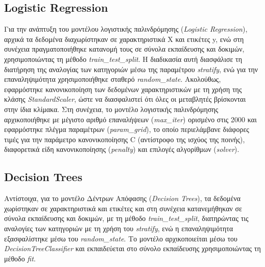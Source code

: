 \documentclass[diploma]{softlab-thesis}
\begin{document}
\begin{enumerate}
\begin{enumerate}
\subsection{Logistic Regression}

Για την ανάπτυξη του μοντέλου λογιστικής παλινδρόμησης (\textit{Logistic Regression}), αρχικά τα δεδομένα διαχωρίστηκαν σε χαρακτηριστικά X και ετικέτες y, ενώ στη συνέχεια πραγματοποιήθηκε κατανομή τους σε σύνολα εκπαίδευσης και δοκιμών, χρησιμοποιώντας τη μέθοδο \textit{train\_test\_split}. Η διαδικασία αυτή διασφάλισε τη διατήρηση της αναλογίας των κατηγοριών μέσω της παραμέτρου \textit{stratify}, ενώ για την επαναληψιμότητα χρησιμοποιήθηκε σταθερό \textit{random\_state}. Ακολούθως, εφαρμόστηκε κανονικοποίηση των δεδομένων χαρακτηριστικών με τη χρήση της κλάσης \textit{StandardScaler}, ώστε να διασφαλιστεί ότι όλες οι μεταβλητές βρίσκονται στην ίδια κλίμακα. Στη συνέχεια, το μοντέλο λογιστικής παλινδρόμησης αρχικοποιήθηκε με μέγιστο αριθμό επαναλήψεων (\textit{max\_iter}) ορισμένο στις 2000 και εφαρμόστηκε πλέγμα παραμέτρων (\textit{param\_grid}), το οποίο περιελάμβανε διάφορες τιμές για την παράμετρο κανονικοποίησης C (αντίστροφο της ισχύος της ποινής), διαφορετικά είδη κανονικοποίησης (\textit{penalty}) και επιλογές αλγορίθμων (\textit{solver}).


\subsection{Decision Trees}

Αντίστοιχα, για το μοντέλο Δέντρων 
Απόφασης (\textit{Decision Trees}), τα δεδομένα χωρίστηκαν σε χαρακτηριστικά και ετικέτες και στη συνέχεια κατανεμήθηκαν σε σύνολα εκπαίδευσης και δοκιμών, με τη μέθοδο \textit{train\_test\_split}, διατηρώντας τις αναλογίες των κατηγοριών με τη χρήση του \textit{stratify}, ενώ η επαναληψιμότητα εξασφαλίστηκε μέσω του \textit{random\_state}. Το μοντέλο αρχικοποιείται μέσω του \textit{DecisionTreeClassifier} και εκπαιδεύεται στο σύνολο εκπαίδευσης χρησιμοποιώντας τη μέθοδο \textit{fit}.


\end{enumerate}
\end{enumerate}
\end{document}
